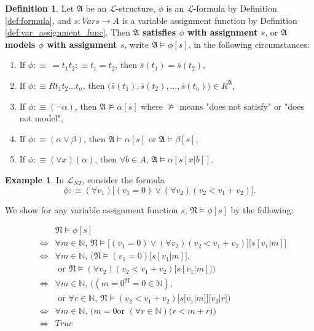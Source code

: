 \documentclass[11pt,letterpaper]{book}
\theoremstyle{definition}
\newtheorem{definition}{Definition}[section]
\newtheorem{example}{Example}[section]
\begin{document}
\begin{definition}\label{def:model_with_assignment}
Let $\mathfrak{A}$ be an $\mathcal{L}$-structure, $\phi$ is an
$\mathcal{L}$-formula by Definition \ref{def:formula}, and $s: Vars
\rightarrow A$ is a variable assignment function by Definition
\ref{def:var_assignment_func}. Then \textbf{$\mathfrak{A}$ satisfies
$\phi$ with assignment $s$}, or \textbf{$\mathfrak{A}$ models
$\phi$ with assignment $s$}, write $\mathfrak{A} \models \phi[s] $, in
the following circumstances:
\begin{enumerate}
\item{If $\phi :\equiv\ =t_1 t_2 :\equiv t_1 = t_2$, then $\overline{s}
(t_1) = \overline{s} (t_2)$,}
\item{If $\phi :\equiv R t_1 t_2 \ldots t_n$, then $\big(\overline{s}
(t_1),\overline{s} (t_2),\ldots,\overline{s} (t_n) \big) \in
R^{\mathfrak{A}}$,}
\item{If $\phi :\equiv (\lnot \alpha)$, then $\mathfrak{A} \not \models
\alpha[s]$ where $\not \models $ means "does not satisfy" or "does not
model",}
\item{If $\phi :\equiv (\alpha \lor \beta)$, then $\mathfrak{A} \models
\alpha[s]$ or $\mathfrak{A} \models \beta[s]$,}
\item{If $\phi :\equiv (\forall x) (\alpha)$, then $\forall b \in A$,
$\mathfrak{A} \models \alpha[s[x|b]]$.}
\end{enumerate}

\end{definition}

\begin{example}
In $\mathcal{L}_{NT}$, consider the formula
$$ \phi :\equiv (\forall v_1 ) \Big[ (v_1 = 0 ) \lor (\forall v_2) (v_2
< v_1 + v_2) \Big]. $$

We show for any variable assignment function $s$, $\mathfrak{N} \models
\phi[s]$ by the following:

\begin{eqnarray*}
& & \mathfrak{N} \models \phi[s] \\
&\iff & \forall m \in \mathbb{N}, \, \mathfrak{N} \models \Big[ (v_1 = 0
) \lor (\forall v_2) (v_2 < v_1 + v_2) \Big] \big[s[v_1 | m]\big] \\
&\iff & \forall m \in \mathbb{N}, \, \Bigg( \mathfrak{N} \models (v_1=0)
\big[s[v_1 | m]\big] , \\
& & \text{ or } \mathfrak{N} \models (\forall v_2) (v_2
< v_1 + v_2 ) \big[s[v_1 | m]\big] \Bigg) \\
&\iff & \forall m \in \mathbb{N}, \, \Bigg( (m=0^{\mathfrak{N}} = 0 \in
\mathbb{N}), \\
& &  \text{ or } \forall r \in \mathbb{N}, \, \mathfrak{N}
\models (v_2 < v_1 + v_2 ) \big[s[v_1 | m]\big]\big[ v_2 | r \big] \Bigg) \\
& \iff & \forall m \in \mathbb{N}, \, \Bigg( m = 0 \text{
or } ( \forall r \in \mathbb{N} ) \big( r < m + r \big) \Bigg) \\
& \iff & True
\end{eqnarray*}


\end{example}
\end{document}
